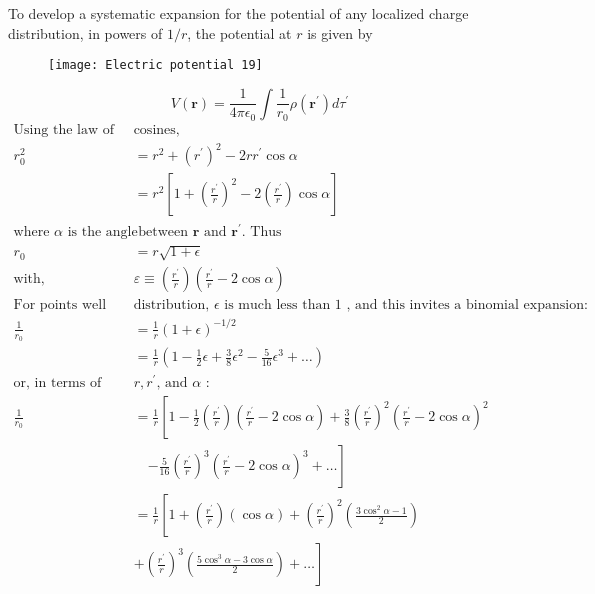 To develop a systematic expansion for the potential of any localized charge distribution, in powers of $1/r$, the potential at $r$ is given by \\
\begin{figure}[H]
	\centering
	\texttt{[image: Electric potential 19]}
	\caption{}
	\label{}
\end{figure}
\begin{equation}
V(\mathbf{r})=\frac{1}{4 \pi \epsilon_{0}} \int \frac{1}{r_0} \rho\left(\mathbf{r}^{\prime}\right) d \tau^{\prime}\label{EP1}
\end{equation}
\begin{align*}
\text{Using the law of }&\text{cosines,}\\
r_0^{2}&=r^{2}+\left(r^{\prime}\right)^{2}-2 r r^{\prime} \cos \alpha\\
&=r^{2}\left[1+\left(\frac{r^{\prime}}{r}\right)^{2}-2\left(\frac{r^{\prime}}{r}\right) \cos \alpha\right]\\
\text{where $\alpha$ is the angle}&\text{ between $\mathbf{r}$ and $\mathbf{r}^{\prime}$. Thus}\\
r_0&=r \sqrt{1+\epsilon}\\
\text{with, }&\varepsilon \equiv\left(\frac{r^{\prime}}{r}\right)\left(\frac{r^{\prime}}{r}-2 \cos \alpha\right)\\
\text{For points well outside the charge }&\text{distribution, $\epsilon$ is much less than 1 , and this invites a binomial expansion:}\\
\frac{1}{r_0}&=\frac{1}{r}(1+\epsilon)^{-1 / 2}\\
&=\frac{1}{r}\left(1-\frac{1}{2} \epsilon+\frac{3}{8} \epsilon^{2}-\frac{5}{16} \epsilon^{3}+\ldots\right)\\
\text{or, in terms of }&\text{$r, r^{\prime}$, and $\alpha$ :}\\
\frac{1}{r_0}&=\frac{1}{r}\left[1-\frac{1}{2}\left(\frac{r^{\prime}}{r}\right)\left(\frac{r^{\prime}}{r}-2 \cos \alpha\right)+\frac{3}{8}\left(\frac{r^{\prime}}{r}\right)^{2}\left(\frac{r^{\prime}}{r}-2 \cos \alpha\right)^{2}\right. \\
& \left. \right.  \quad \left.-\frac{5}{16}\left(\frac{r^{\prime}}{r}\right)^{3}\left(\frac{r^{\prime}}{r}-2 \cos \alpha\right)^{3}+\ldots\right] \\
&=\frac{1}{r}\left[1+\left(\frac{r^{\prime}}{r}\right)(\cos \alpha)+\left(\frac{r^{\prime}}{r}\right)^{2}\left(\frac{3 \cos ^{2} \alpha-1}{2}\right)\right. \\
\left. \right.  \quad &\left.+\left(\frac{r^{\prime}}{r}\right)^{3}\left(\frac{5 \cos ^{3} \alpha-3 \cos \alpha}{2}\right)+\ldots\right]
\end{align*}
